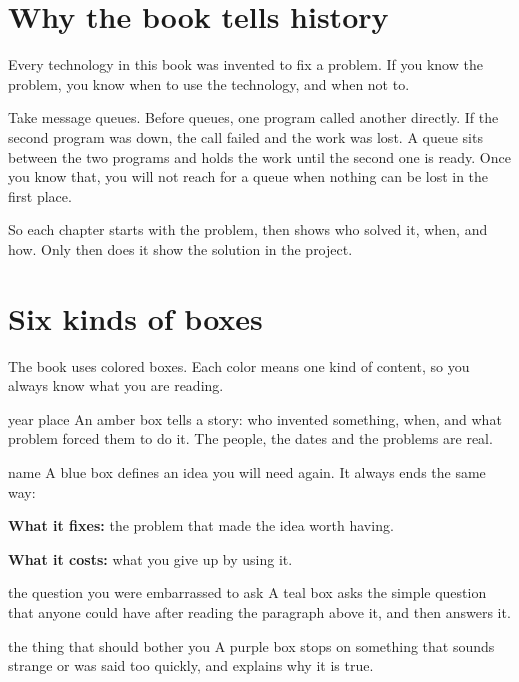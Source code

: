 \section*{Why the book tells history}

Every technology in this book was invented to fix a problem. If you know the
problem, you know when to use the technology, and when not to.

Take message queues. Before queues, one program
called another directly. If the second program was down, the call failed and
the work was lost. A queue sits between the two programs and holds the work
until the second one is ready. Once you know that, you will not reach for a
queue when nothing can be lost in the first place.

So each chapter starts with the problem, then shows who solved it, when, and
how. Only then does it show the solution in the project.

\section*{Six kinds of boxes}

The book uses colored boxes. Each color means one kind of content, so you
always know what you are reading.

\begin{history}{year \textperiodcentered{} place}
An amber box tells a story: who invented something, when, and what problem
forced them to do it. The people, the dates and the problems are real.
\end{history}

\begin{concept}{name}
A blue box defines an idea you will need again. It always ends the same way:

\textbf{What it fixes:} the problem that made the idea worth having.

\textbf{What it costs:} what you give up by using it.
\end{concept}

\begin{question}{the question you were embarrassed to ask}
A teal box asks the simple question that anyone could have after reading the
paragraph above it, and then answers it.
\end{question}

\begin{reflection}{the thing that should bother you}
A purple box stops on something that sounds strange or was said too quickly,
and explains why it is true.
\end{reflection}


